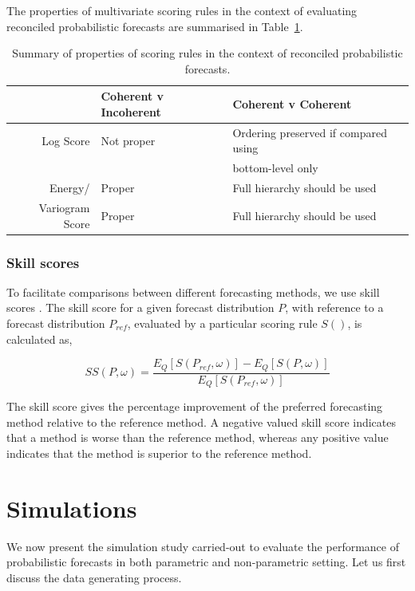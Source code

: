 \documentclass[12pt]{article}
\theoremstyle{definition}
\begin{document}
The properties of multivariate scoring rules in the context of evaluating reconciled probabilistic forecasts are summarised in Table~\ref{tab:prop}.

\begin{table}
	\caption{Summary of properties of scoring rules in the context of reconciled probabilistic forecasts.}
	\centering
	\begin{tabular}{rll}
		& Coherent v Incoherent &Coherent v Coherent\\
		\hline
		Log Score & Not proper & Ordering preserved if compared using\\ &&bottom-level only\\
		Energy/ & Proper & Full hierarchy should be used\\
		Variogram Score & Proper & Full hierarchy should be used\\
		\hline
	\end{tabular}
	
	\label{tab:prop}
\end{table}


\subsubsection{Skill scores}

To facilitate comparisons between different forecasting methods, we use skill scores \citep{Gneiting2007}. The skill score for a given forecast distribution $P$,  with reference to a forecast distribution $P_{ref}$, evaluated by a particular scoring rule $S()$, is calculated as, 

\begin{equation}
SS(P, \omega) = \frac{E_Q[S(P_{ref}, \omega)] - E_Q[S(P, \omega)]}{E_Q[S(P_{ref}, \omega)]}
\end{equation}

The skill score gives the percentage improvement of the preferred forecasting method relative to the reference method. A negative valued skill score indicates that a method is worse than the reference method, whereas any positive value indicates that the method is superior to the reference method. 


\section{Simulations}

We now present the simulation study carried-out to evaluate the performance of probabilistic forecasts in both parametric and non-parametric setting. Let us first discuss the data generating process.
\end{document}
